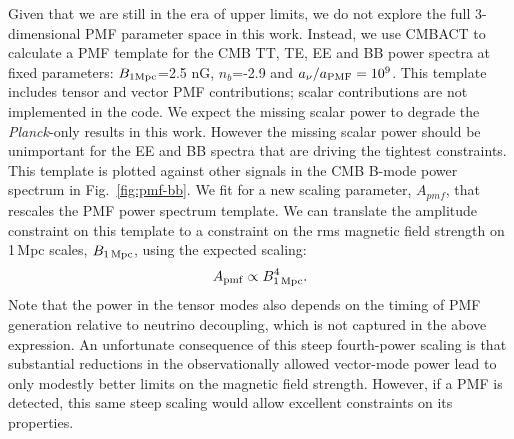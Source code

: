 \documentclass[apj]{emulateapj}
\newcommand{\apmf}{\ensuremath{A_{\rm pmf}}}
\newcommand{\bpmf}{\ensuremath{B_{\rm 1\,Mpc}}}
\newcommand{\be}{\begin{equation}}
\newcommand{\ee}{\end{equation}}
\newcommand{\planck}{{\sl Planck}}
\begin{document}
Given that we are still in the era of upper limits,  we do not explore the full 3-dimensional PMF parameter space in this work. 
Instead, we use CMBACT to calculate a PMF template for the CMB TT, TE, EE and BB power spectra at fixed parameters: $B_{\rm{1Mpc}}$=2.5 \rm{nG}, $n_b$=-2.9 and $a_{\nu}/a_{\rm{PMF}}=10^9$. 
This template includes tensor and vector PMF contributions; scalar contributions are not implemented in the code. 
We expect the missing scalar power to degrade the \planck-only results in this work.
However the missing scalar power should be  unimportant for the EE and BB spectra that are driving the tightest constraints. 
This template is plotted against other signals in the CMB B-mode power spectrum in Fig.~\ref{fig:pmf-bb}. 
We fit for a new scaling parameter, $A_{pmf}$, that rescales the PMF power spectrum template. 
We can translate the amplitude constraint on this template to a constraint on the rms magnetic field strength on 1\,Mpc scales, \bpmf, using the expected scaling:
\be
\apmf \propto \bpmf^4.
\ee
Note that the power in the tensor modes also depends on the timing of PMF generation relative to neutrino decoupling, which is not captured in the above expression. 
An unfortunate consequence of this steep fourth-power scaling is that substantial reductions in the observationally allowed vector-mode power lead to only modestly better limits on the magnetic field strength. 
However, if a PMF is detected, this same steep scaling would allow excellent constraints on its properties.
\end{document}
